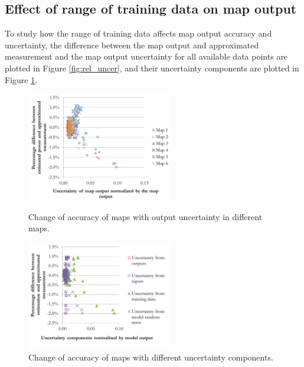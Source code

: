 \subsection{Effect of range of training data on map output} \label{subsec:comp_uncer}

To study how the range of training data affects map output accuracy and uncertainty, the difference between the map output and approximated measurement and the map output uncertainty for all available data points are plotted in Figure \ref{fig:rel_uncer}, and their uncertainty components are plotted in Figure \ref{fig:uncer_comp}.

\begin{figure}[h]
\begin{minipage}{15pc}
\includegraphics[width=15pc]{rel_diff_to_rel_uncer.pdf}
\caption{\label{fig:rel_uncer}Change of accuracy of maps with output uncertainty in different maps.}
\end{minipage}\hspace{2pc}%
\begin{minipage}{15pc}
\includegraphics[width=15pc]{rel_diff_to_uncer_comp.pdf}
\caption{\label{fig:uncer_comp}Change of accuracy of maps with different uncertainty components.}
\end{minipage} 
\end{figure}

